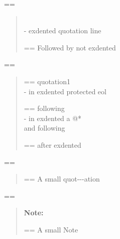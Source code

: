 \documentclass{book}
\makeatletter
\newenvironment{Texinfopreformatted}{%
  \par\GNUTobeylines\obeyspaces\frenchspacing\parskip=\z@\parindent=\z@}{}
{\catcode`\^^M=13 \gdef\GNUTobeylines{\catcode`\^^M=13 \def^^M{\null\par}}}
\newenvironment{Texinfoindented}{\begin{list}{}{}\item\relax}{\end{list}}
\renewcommand{\_}{\Texinfounderscore\discretionary{}{}{}}
\makeatother
\begin{document}
{{\begin{Texinfoindented}
\begin{Texinfopreformatted}%
\ttfamily 
\end{Texinfopreformatted}
\begin{quote}
\leavevmode{}\\
\hbox{\kern -\leftmargin}%
exdented quotation line
\\
\begin{Texinfopreformatted}%
\ttfamily Followed by not exdented 
\end{Texinfopreformatted}
\end{quote}
\begin{Texinfopreformatted}%
\ttfamily 
\end{Texinfopreformatted}
\begin{quote}
\begin{Texinfopreformatted}%
\ttfamily quotation1
\end{Texinfopreformatted}
\leavevmode{}\\
\hbox{\kern -\leftmargin}%
in exdented protected eol \ {}
\\
\begin{Texinfopreformatted}%
\ttfamily following
\end{Texinfopreformatted}
\leavevmode{}\\
\hbox{\kern -\leftmargin}%
in exdented a @* \leavevmode{}\\ and following
\\
\begin{Texinfopreformatted}%
\ttfamily after exdented
\end{Texinfopreformatted}
\end{quote}
\begin{Texinfopreformatted}%
\ttfamily 
\end{Texinfopreformatted}
\begin{quote}
\begin{footnotesize}
\begin{Texinfopreformatted}%
\ttfamily A small quot{-}{-}{-}ation
\end{Texinfopreformatted}
\end{footnotesize}
\end{quote}
\begin{Texinfopreformatted}%
\ttfamily 
\end{Texinfopreformatted}
\begin{quote}
\begin{footnotesize}
\textbf{Note:} \begin{Texinfopreformatted}%
\ttfamily A small Note
\end{Texinfopreformatted}

\end{footnotesize}
\end{quote}
\end{Texinfoindented}}}
\end{document}
